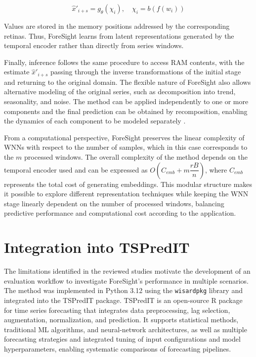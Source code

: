 \documentclass[final,3p,times,twocolumn,authoryear]{elsarticle}
\begin{document}
\begin{equation}
\label{eq_foresight_pred}
    \hat{x}'_{i+s} = g_{\theta}(\chi_i), \quad \chi_i = b(f(w_i))
\end{equation}

Values are stored in the memory positions addressed by the corresponding retinas. Thus, ForeSight learns from latent representations generated by the temporal encoder rather than directly from series windows.

Finally, inference follows the same procedure to access RAM contents, with the estimate $\hat{x}'_{i+s}$ passing through the inverse transformations of the initial stage and returning to the original domain. The flexible nature of ForeSight also allows alternative modeling of the original series, such as decomposition into trend, seasonality, and noise. The method can be applied independently to one or more components and the final prediction can be obtained by recomposition, enabling the dynamics of each component to be modeled separately \citep{hyndman_forecasting_2021}.

From a computational perspective, ForeSight preserves the linear complexity of WNNs with respect to the number of samples, which in this case corresponds to the $m$ processed windows. The overall complexity of the method depends on the temporal encoder used and can be expressed as $O\left(C_{\textit{emb}} + m\dfrac{rB}{n}\right)$, where $C_{\textit{emb}}$ represents the total cost of generating embeddings. This modular structure makes it possible to explore different representation techniques while keeping the WNN stage linearly dependent on the number of processed windows, balancing predictive performance and computational cost according to the application.


\section{Integration into TSPredIT}
\label{sec_framework}


The limitations identified in the reviewed studies motivate the development of an evaluation workflow to investigate ForeSight's performance in multiple scenarios. The method was implemented in Python 3.12 using the \texttt{wisardpkg} library \citep{lima_wisardpkg_2020} and integrated into the TSPredIT package. TSPredIT is an open-source R package for time series forecasting that integrates data preprocessing, lag selection, augmentation, normalization, and prediction. It supports statistical methods, traditional ML algorithms, and neural-network architectures, as well as multiple forecasting strategies and integrated tuning of input configurations and model hyperparameters, enabling systematic comparisons of forecasting pipelines.
\end{document}
